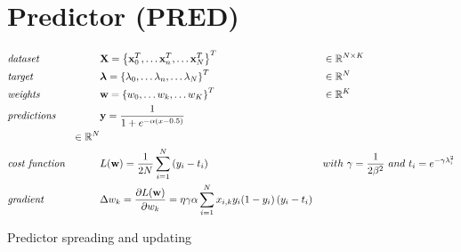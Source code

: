 \documentclass[a4paper]{article}
\begin{document}
\pagebreak
\section*{Predictor (PRED)}
\begin{align}
	&\emph{dataset} &&\mathbf{X}=\left\{\mathbf{x}^T_0,\dots\mathbf{x}^T_n,\dots\mathbf{x}^T_N\right\}^T &&\in\mathbb{R}^{N\times K} \nonumber\\
    &\emph{target} &&\boldsymbol{\lambda}=\left\{\lambda_0,\dots\lambda_n,\dots\lambda_N\right\}^T&&\in\mathbb{R}^N\nonumber\\
      &\emph{weights}&&\mathbf{w}=\left\{w_0,\dots w_k,\dots w_K\right\}^T&&\in\mathbb{R}^K\nonumber\\
	&\emph{predictions} && \mathbf{y} = \frac{1}{1 + e^{-\alpha(x-0.5)}} \nonumber\\
    &&\in\mathbb{R}^{N} \nonumber\\
    &\emph{cost function}&&L(\mathbf{w}) = \frac{1}{2N}\sum_{i=1}^N{\left(y_i - t_i\right)}&&with\ \gamma = \frac{1}{2\beta^2}\ and\ t_i=e^{-\gamma\lambda_i^2}\nonumber\\
    &\emph{gradient}&&\Delta w_k = \frac{\partial{L(\mathbf{w})}}{\partial{w_k}} =\eta\gamma\alpha\sum_{i=1}^N x_{i, k} y_i(1-y_i)\left(y_i - t_i\right) \nonumber
\end{align}

\IncMargin{1em}
\begin{algorithm}[H]

\DontPrintSemicolon
{}    
\BlankLine
\BlankLine
{}
\BlankLine
\BlankLine
\BlankLine
\BlankLine
\BlankLine
\BlankLine
{}    
\BlankLine
\BlankLine
{}
\caption{Predictor spreading and updating}\label{pred}
\end{algorithm}
\DecMargin{1em}
\end{document}
